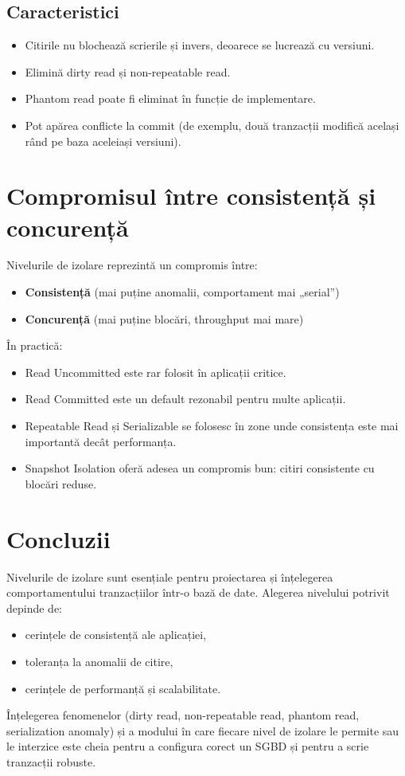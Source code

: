 \documentclass[11pt,a4paper]{article}
\begin{document}
\subsection{Caracteristici}

\begin{itemize}[leftmargin=1.5cm]
  \item Citirile nu blochează scrierile și invers, deoarece se lucrează cu versiuni.
  \item Elimină dirty read și non-repeatable read.
  \item Phantom read poate fi eliminat în funcție de implementare.
  \item Pot apărea conflicte la commit (de exemplu, două tranzacții modifică același rând pe baza aceleiași versiuni).
\end{itemize}

\section{Compromisul între consistență și concurență}

Nivelurile de izolare reprezintă un compromis între:
\begin{itemize}[leftmargin=1.5cm]
  \item \textbf{Consistență} (mai puține anomalii, comportament mai „serial”)
  \item \textbf{Concurență} (mai puține blocări, throughput mai mare)
\end{itemize}

În practică:
\begin{itemize}[leftmargin=1.5cm]
  \item Read Uncommitted este rar folosit în aplicații critice.
  \item Read Committed este un default rezonabil pentru multe aplicații.
  \item Repeatable Read și Serializable se folosesc în zone unde consistența este mai importantă decât performanța.
  \item Snapshot Isolation oferă adesea un compromis bun: citiri consistente cu blocări reduse.
\end{itemize}

\section{Concluzii}

Nivelurile de izolare sunt esențiale pentru proiectarea și înțelegerea comportamentului tranzacțiilor într-o bază de date. Alegerea nivelului potrivit depinde de:
\begin{itemize}[leftmargin=1.5cm]
  \item cerințele de consistență ale aplicației,
  \item toleranța la anomalii de citire,
  \item cerințele de performanță și scalabilitate.
\end{itemize}

Înțelegerea fenomenelor (dirty read, non-repeatable read, phantom read, serialization anomaly) și a modului în care fiecare nivel de izolare le permite sau le interzice este cheia pentru a configura corect un SGBD și pentru a scrie tranzacții robuste.
\end{document}
